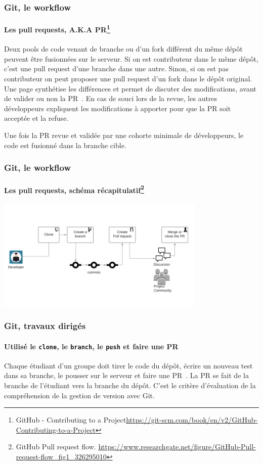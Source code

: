 \documentclass{beamer}
\begin{document}
    \begin{frame}
        \frametitle{Git, le workflow}
        \framesubtitle{Les pull requests, A.K.A PR\footnote{GitHub - Contributing to a Project\url{https://git-scm.com/book/en/v2/GitHub-Contributing-to-a-Project}}}
        \transdissolve
        Deux pools de code venant de branche ou d'un fork différent du même dépôt peuvent être fusionnées  sur le serveur.
        \bigbreak
        Si on est contributeur dans le même dépôt, c'est une pull request d'une branche dans une autre.
        Sinon, si on est pas contributeur on peut proposer une pull request d'un fork dans le dépôt original.
        \bigbreak
        Une page synthétise les différences et permet de discuter des modifications, avant de valider ou non la PR~.
        \bigbreak
        En cas de souci lors de la revue, les autres développeurs expliquent les modifications à apporter pour que la PR soit acceptée et la refuse. 

        Une fois la PR revue et validée par une cohorte minimale de développeurs, le code est fusionné dans la branche cible. 
    \end{frame}

    \begin{frame}
        \frametitle{Git, le workflow}
        \framesubtitle{Les pull requests, schéma récapitulatif\footnote{GitHub Pull request flow. \url{https://www.researchgate.net/figure/GitHub-Pull-request-flow_fig1_326295010}}}
        \transdissolve
        \begin{center}
            \includegraphics[width=10cm]{image/github-pull-request-flow.png}
        \end{center}
    \end{frame}

    \begin{frame}
        \frametitle{Git, travaux dirigés}
        \framesubtitle{Utilisé le \lstinline{clone}, le \lstinline{branch}, le \lstinline{push} et faire une PR}
        \transdissolve
        Chaque étudiant d'un groupe doit tirer le code du dépôt, écrire un nouveau test dans sa branche, le pousser sur le serveur et faire une PR~.
        \bigbreak
        La PR se fait de la branche de l'étudiant vers la branche  du dépôt.
        \bigbreak
        C'est le critère d'évaluation de la compréhension de la gestion de version avec Git.
    \end{frame}
\end{document}
